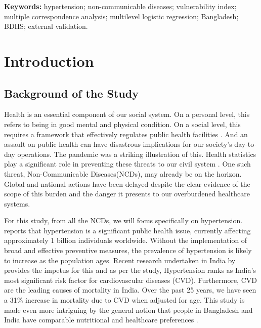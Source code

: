 \documentclass[
  12pt,
  a4paper]{article}
\begin{document}
\textbf{Keywords:} hypertension; non-communicable diseases; vulnerability index; multiple correspondence analysis; multilevel logistic regression; Bangladesh; BDHS; external validation.

\newpage

\section{Introduction}\label{introduction}

\subsection{Background of the Study}\label{background-of-the-study}

Health is an essential component of our social system. On a personal level, this refers to being in good mental and physical condition. On a social level, this requires a framework that effectively regulates public health facilities \citep{rothstein2002rethinking}. And an assault on public health can have disastrous implications for our society's day-to-day operations. The pandemic was a striking illustration of this. Health statistics play a significant role in preventing these threats to our civil system \citep{coccia2021pandemic}. One such threat, Non-Communicable Diseases(NCDs), may already be on the horizon. Global and national actions have been delayed despite the clear evidence of the scope of this burden and the danger it presents to our overburdened healthcare systems\citep{meetoo_chronic_2008}.

For this study, from all the NCDs, we will focus specifically on hypertension. \citet{chobanian2003seventh} reports that hypertension is a significant public health issue, currently affecting approximately 1 billion individuals worldwide. Without the implementation of broad and effective preventive measures, the prevalence of hypertension is likely to increase as the population ages. Recent research undertaken in India by \citet{gupta_hypertension_2018} provides the impetus for this and as per the study, Hypertension ranks as India's most significant risk factor for cardiovascular diseases (CVD). Furthermore, CVD are the leading causes of mortality in India. Over the past 25 years, we have seen a 31\% increase in mortality due to CVD when adjusted for age. This study is made even more intriguing by the general notion that people in Bangladesh and India have comparable nutritional and healthcare preferences \citep{rahman2017epidemiological}.
\end{document}
